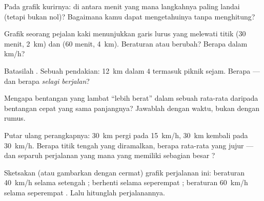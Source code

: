 \begin{exercise}[$\star$]\label{exo:g7:motion-average-speed:5}
Pada grafik kurirnya: di antara menit yang mana langkahnya paling
landai (tetapi bukan nol)? Bagaimana kamu dapat mengetahuinya tanpa
menghitung?
\end{exercise}

\begin{exercise}[$\star$]\label{exo:g7:motion-average-speed:6}
Grafik seorang pejalan kaki menunjukkan garis lurus yang melewati
titik ($30$ menit, \qty{2}{km}) dan ($60$ menit, \qty{4}{km}).
Beraturan atau berubah? Berapa  dalam \unit{km/h}?
\end{exercise}

\begin{exercise}[$\star$]\label{exo:g7:motion-average-speed:7}
Batasilah . Sebuah pendakian: \qty{12}{km} dalam $4$
 termasuk piknik sejam. Berapa  --- dan berapa
 \emph{selagi berjalan}?
\end{exercise}

\begin{exercise}[$\star\star$]\label{exo:g7:motion-average-speed:8}
Mengapa bentangan yang lambat ``lebih berat'' dalam sebuah rata-rata
daripada bentangan cepat yang sama panjangnya? Jawablah dengan waktu,
bukan dengan rumus.
\end{exercise}

\begin{exercise}[$\star\star$]\label{exo:g7:motion-average-speed:9}
Putar ulang perangkapnya: \qty{30}{km} pergi pada \qty{15}{km/h},
\qty{30}{km} kembali pada \qty{30}{km/h}. Berapa titik tengah yang
diramalkan, berapa rata-rata yang jujur --- dan separuh perjalanan
yang mana yang memiliki sebagian besar ?
\end{exercise}

\begin{exercise}[$\star\star$]\label{exo:g7:motion-average-speed:10}
Sketsakan (atau gambarkan dengan cermat) grafik perjalanan ini:
beraturan \qty{40}{km/h} selama setengah ; berhenti selama
seperempat ; beraturan \qty{60}{km/h} selama seperempat . Lalu
hitunglah  perjalanannya.
\end{exercise}

